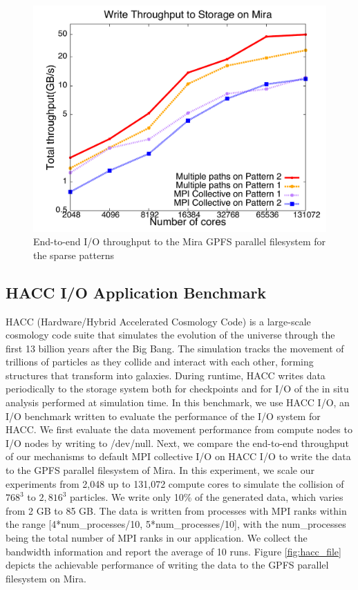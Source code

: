 \documentclass[final,5p,times]{elsarticle}
\begin{document}
\begin{figure}[!htb]
\centering
\includegraphics[scale=0.3]{mira_file.pdf}
\caption{End-to-end I/O throughput to the Mira GPFS parallel filesystem for the sparse patterns}
\label{fig:mira_file}
\end{figure}


\subsection{HACC I/O Application Benchmark}
HACC (Hardware/Hybrid Accelerated Cosmology Code) \cite{Habib:HACC} is a large-scale cosmology code suite that simulates the evolution of the universe through the first 13 billion years after the Big Bang. The simulation tracks the movement of trillions of particles as they collide and interact with each other, forming structures that transform into galaxies. During runtime, HACC writes data periodically to the storage system both for checkpoints and for I/O of the in situ analysis performed at simulation time. 
In this benchmark, we use HACC I/O, an I/O benchmark written to evaluate the performance of the I/O system for HACC.
We first evaluate the data movement performance from compute nodes to I/O nodes by writing to /dev/null. Next, we compare the end-to-end throughput of our mechanisms to default MPI collective I/O on HACC I/O to write the data to the GPFS parallel filesystem of Mira.  In this experiment, we scale our experiments from 2,048 up to 131,072 compute cores to simulate the collision of $768^3$ to $2,816^3$ particles. We write only 10\% of the generated data, which varies from 2 GB to 85 GB. The data is written from processes with MPI ranks within the range [4*num\_processes/10, 5*num\_processes/10], with the num\_processes being the total number of MPI ranks in our application. We collect the bandwidth information and report the average of 10 runs. Figure \ref{fig:hacc_file} depicts the achievable performance of writing the data to the GPFS parallel filesystem on Mira. 
\end{document}
